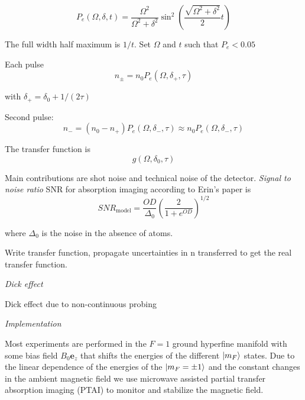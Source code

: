 \documentclass[
superscriptaddress,
amsmath,
amssymb,
aps,
prl,
twocolumn,
floatfix
]{revtex4-1}
\def\ez{\mathbf{e}_z}
\def\ket#1{\mathinner{|{#1}\rangle}}
\begin{document}
\begin{equation}
	P_e(\Omega, \delta, t)=\frac{\Omega^2}{\Omega^2+\delta^2}\sin^2\left(\frac{\sqrt{\Omega^2+\delta^2}}{2}t\right)
	\label{eq:Rabi_oscillations}	
\end{equation}

The full width half maximum is $1/t$. Set $\Omega$ and $t$ such that $P_e<0.05$

Each pulse 
\begin{equation}
	n_\pm = n_0 P_e(\Omega, \delta_+, \tau)
\end{equation}

with $\delta_+=\delta_0+1/(2\tau)$ 

Second pulse:
\begin{equation}
	n_-=(n_0-n_+)P_e(\Omega, \delta_-, \tau)\approx n_0P_e(\Omega, \delta_-, \tau)
\end{equation}

The transfer function is 
\begin{equation}
	g(\Omega, \delta_0, \tau)
\end{equation}


Main contributions are shot noise and technical noise of the detector. 
{\it Signal to noise ratio}
SNR for absorption imaging according to Erin's paper is 
\begin{equation}
	SNR_{\mathrm{model}}=\frac{OD}{\Delta_0}\left(\frac{2}{1+e^{OD}}\right)^{1/2}
\end{equation}

where $\Delta_0$ is the noise in the absence of atoms.

Write transfer function, propagate uncertainties in n transferred to get the real transfer function. 



{\it Dick effect}

Dick effect due to non-continuous probing 


%
%

{\it Implementation} 

Most experiments are performed in the $F=1$ ground hyperfine manifold with some bias field $B_0\ez$ that shifts the energies of the different $\ket{m_F}$ states. Due to the linear dependence of the energies of the $\ket{m_F=\pm1}$ and the constant changes in the ambient magnetic field we use microwave assisted partial transfer absorption imaging (PTAI) to monitor and stabilize the magnetic field. 
\end{document}
